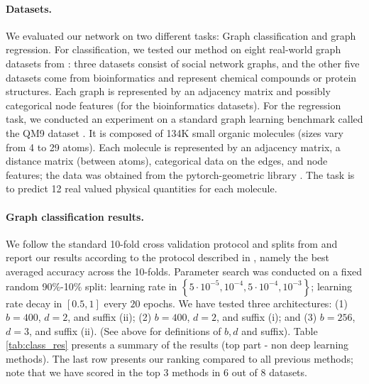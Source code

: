 \documentclass{article}
\newcommand{\set}[1]{\left\{#1\right\}}
\begin{document}
\paragraph{Datasets.} We evaluated our network on two different tasks: Graph classification and graph regression. For classification, we tested our method on eight real-world graph datasets from \citep{Yanardag2015}: three datasets consist of social network graphs, and the other five datasets come from bioinformatics and represent chemical compounds or protein structures. Each graph is represented by an adjacency matrix and possibly categorical node features (for the bioinformatics datasets). For the regression task, we conducted an experiment on a standard graph learning benchmark called the QM9 dataset \citep{ramakrishnan2014quantum, wu2018moleculenet}. It is composed of 134K small organic molecules (sizes vary from 4 to 29 atoms). Each molecule is represented by an adjacency matrix, a distance matrix (between atoms), categorical data on the edges, and node features; the data was obtained from the pytorch-geometric library \citep{fey2019fast}. The task is to predict 12 real valued physical quantities for each molecule. 




\paragraph{Graph classification results.} 
We follow the standard 10-fold cross validation protocol and splits from \cite{Zhang} and report our results according to the protocol described in \cite{xu2018how}, namely the best averaged accuracy across the 10-folds. Parameter search was conducted on a fixed random 90$\%$-10$\%$ split: learning rate in $\set{5\cdot10^{-5},10^{-4},5\cdot10^{-4},10^{-3}}$; learning rate decay in $[0.5,1]$ every $20$ epochs.
We have tested three architectures: (1) $b=400$, $d=2$, and suffix (ii); (2) $b=400$, $d=2$, and suffix (i); and (3) $b=256$, $d=3$, and suffix (ii). (See above for definitions of $b,d$ and suffix). Table \ref{tab:class_res} presents a summary of the results (top part - non deep learning methods). The last row presents our ranking compared to all previous methods; note that we have scored in the top $3$ methods in $6$ out of $8$ datasets.  




\pagebreak
\end{document}
